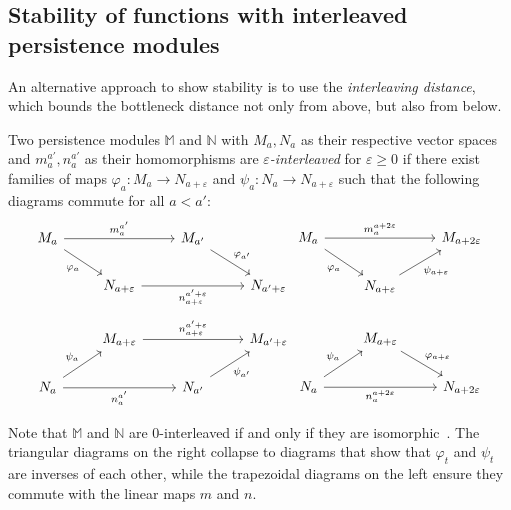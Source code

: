 \subsection{Stability of functions with interleaved persistence modules}

An alternative approach to show stability is to use the \emph{interleaving
distance}, which bounds the bottleneck distance not only from above, but also
from below.
\begin{definition}
    \label{def:interleaving}
    Two persistence modules $\mathbb{M}$ and $\mathbb{N}$ with $M_a, N_a$ as
    their respective vector spaces and $m_a^{a'}, n_a^{a'}$ as their
    homomorphisms are \emph{$\varepsilon$-interleaved}
    for $\varepsilon \geq 0$ if there exist families of maps $\varphi_a : M_a
    \to N_{a + \varepsilon}$ and $\psi_a : N_a \to N_{a + \varepsilon}$
    such that the following diagrams commute for all $a < a'$:
    \begin{equation*}
        \begin{tikzcd}
            M_a \arrow{rr}{m_a^{a'}} \arrow{dr}[swap]{\varphi_a} & & M_{a'} \arrow{dr}{\varphi_{a'}} \\
            & N_{a + \varepsilon} \arrow{rr}[swap]{n_{a + \varepsilon}^{a' + \varepsilon}} & & N_{a' + \varepsilon}
        \end{tikzcd}
        \begin{tikzcd}
            M_a \arrow{dr}[swap]{\varphi_a} \arrow{rr}{m_a^{a + 2\varepsilon}} && M_{a + 2\varepsilon} \\
            & N_{a + \varepsilon} \arrow{ur}[swap]{\psi_{a + \varepsilon}}
        \end{tikzcd}
    \end{equation*}
    \begin{equation*}
        \begin{tikzcd}
            & M_{a + \varepsilon} \arrow{rr}{n_{a + \varepsilon}^{a' + \varepsilon}} & & M_{a' + \varepsilon} \\
            N_a \arrow{rr}[swap]{n_a^{a'}} \arrow{ur}{\psi_a} & & N_{a'} \arrow{ur}[swap]{\psi_{a'}}
        \end{tikzcd}
        \begin{tikzcd}
            & M_{a + \varepsilon} \arrow{dr}{\varphi_{a + \varepsilon}} \\
            N_a \arrow{ur}{\psi_a} \arrow{rr}[swap]{n_a^{a + 2\varepsilon}} && N_{a + 2\varepsilon}
        \end{tikzcd}
    \end{equation*}
\end{definition}
Note that $\mathbb{M}$ and $\mathbb{N}$ are $0$-interleaved if and only if
they are isomorphic~\cite{schnider2024introduction}. The triangular diagrams on
the right collapse to diagrams that show that $\varphi_t$ and $\psi_t$ are
inverses of each other, while the trapezoidal diagrams on the left ensure they
commute with the linear maps $m$ and $n$.

